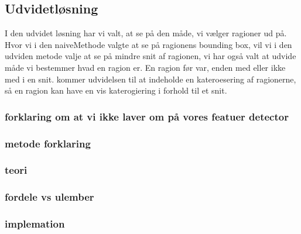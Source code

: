 \subsection{Udvidetløsning}
I den udvidet løsning har vi valt, at se på den måde, vi vælger ragioner
ud på. Hvor vi i den naiveMethode valgte at se på ragionens bounding
box, vil vi i den udviden metode valje at se på mindre snit af ragionen,
vi har også valt at udvide måde vi bestemmer hvad en ragion er. En
ragion før var, enden med eller ikke med i en snit. kommer udvidelsen
til at indeholde en kateroesering af ragionerne, så en ragion kan have
en vis katerogiering i forhold til et snit.


\subsubsection{forklaring om at vi ikke laver om på vores featuer detector}

\subsubsection{metode forklaring}

\subsubsection{teori}

\subsubsection{fordele vs ulember}

\subsubsection{implemation}
